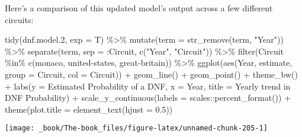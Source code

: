 \documentclass[
]{book}
\newenvironment{Shaded}{\begin{snugshade}}{\end{snugshade}}
\newcommand{\AttributeTok}[1]{\textcolor[rgb]{0.77,0.63,0.00}{#1}}
\newcommand{\FloatTok}[1]{\textcolor[rgb]{0.00,0.00,0.81}{#1}}
\newcommand{\FunctionTok}[1]{\textcolor[rgb]{0.00,0.00,0.00}{#1}}
\newcommand{\NormalTok}[1]{#1}
\newcommand{\SpecialCharTok}[1]{\textcolor[rgb]{0.00,0.00,0.00}{#1}}
\newcommand{\StringTok}[1]{\textcolor[rgb]{0.31,0.60,0.02}{#1}}
\begin{document}
Here's a comparison of this updated model's output across a few different circuits:

\begin{Shaded}
\begin{Highlighting}[]
\FunctionTok{tidy}\NormalTok{(dnf.model}\FloatTok{.2}\NormalTok{, }\AttributeTok{exp =}\NormalTok{ T) }\SpecialCharTok{\%\textgreater{}\%}
  \FunctionTok{mutate}\NormalTok{(}\AttributeTok{term =} \FunctionTok{str\_remove}\NormalTok{(term, }\StringTok{"Year"}\NormalTok{)) }\SpecialCharTok{\%\textgreater{}\%}
  \FunctionTok{separate}\NormalTok{(term, }\AttributeTok{sep =} \StringTok{\textquotesingle{}:Circuit\textquotesingle{}}\NormalTok{, }\FunctionTok{c}\NormalTok{(}\StringTok{"Year"}\NormalTok{, }\StringTok{"Circuit"}\NormalTok{)) }\SpecialCharTok{\%\textgreater{}\%}
  \FunctionTok{filter}\NormalTok{(Circuit }\SpecialCharTok{\%in\%} \FunctionTok{c}\NormalTok{(}\StringTok{\textquotesingle{}monaco\textquotesingle{}}\NormalTok{, }\StringTok{\textquotesingle{}united{-}states\textquotesingle{}}\NormalTok{, }\StringTok{\textquotesingle{}great{-}britain\textquotesingle{}}\NormalTok{)) }\SpecialCharTok{\%\textgreater{}\%} 
  \FunctionTok{ggplot}\NormalTok{(}\FunctionTok{aes}\NormalTok{(Year, estimate, }\AttributeTok{group =}\NormalTok{ Circuit, }\AttributeTok{col =}\NormalTok{ Circuit)) }\SpecialCharTok{+}
  \FunctionTok{geom\_line}\NormalTok{() }\SpecialCharTok{+}
  \FunctionTok{geom\_point}\NormalTok{() }\SpecialCharTok{+} 
  \FunctionTok{theme\_bw}\NormalTok{() }\SpecialCharTok{+}
  \FunctionTok{labs}\NormalTok{(}\AttributeTok{y =} \StringTok{\textquotesingle{}Estimated Probability of a DNF\textquotesingle{}}\NormalTok{,}
       \AttributeTok{x =} \StringTok{\textquotesingle{}Year\textquotesingle{}}\NormalTok{,}
       \AttributeTok{title =} \StringTok{\textquotesingle{}Yearly trend in DNF Probability\textquotesingle{}}\NormalTok{) }\SpecialCharTok{+}
\FunctionTok{scale\_y\_continuous}\NormalTok{(}\AttributeTok{labels =}\NormalTok{ scales}\SpecialCharTok{::}\FunctionTok{percent\_format}\NormalTok{()) }\SpecialCharTok{+}
  \FunctionTok{theme}\NormalTok{(}\AttributeTok{plot.title =} \FunctionTok{element\_text}\NormalTok{(}\AttributeTok{hjust =} \FloatTok{0.5}\NormalTok{))}
\end{Highlighting}
\end{Shaded}

\begin{center}\texttt{[image: \_book/The-book\_files/figure-latex/unnamed-chunk-205-1]} \end{center}
\end{document}
